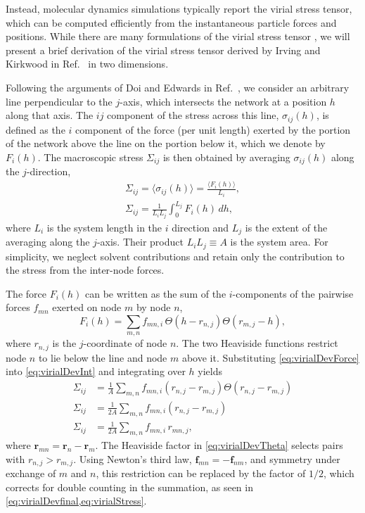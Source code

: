 \documentclass[asymmetricmargins]{library/duthesis}%
\begin{document}
Instead, molecular dynamics simulations typically report the virial stress tensor, which can be computed efficiently from the instantaneous particle forces and positions. While there are many formulations of the virial stress tensor \cite{walton_pressure_1983,erpenbeck_einstein-kubo-helfand_1995,tsai_virial_1979}, we will present a brief derivation of the virial stress tensor derived by Irving and Kirkwood in Ref.~\cite{irving_statistical_1950} in two dimensions.


Following the arguments of Doi and Edwards in Ref.~\cite{doi_theory_1988}, we consider an arbitrary line perpendicular to the $j$-axis, which intersects the network at a position $h$ along that axis. The $ij$ component of the stress across this line, $\sigma_{ij}(h)$, is defined as the $i$ component of the force (per unit length) exerted by the portion of the network above the line on the portion below it, which we denote by $F_i(h)$. The macroscopic stress $\Sigma_{ij}$ is then obtained by averaging $\sigma_{ij}(h)$ along the $j$-direction,
\begin{gather}
    \Sigma_{ij} = \langle \sigma_{ij}(h) \rangle = \frac{\langle F_i(h) \rangle}{L_i}, \\
    \Sigma_{ij} = \frac{1}{L_i L_j}\int_0^{L_j} F_i(h)\, dh,
    \label{eq:virialDevInt}
\end{gather}
where $L_i$ is the system length in the $i$ direction and $L_j$ is the extent of the averaging along the $j$-axis.  Their product $L_iL_j \equiv A$ is the system area. For simplicity, we neglect solvent contributions and retain only the contribution to the stress from the inter-node forces.

The force $F_i(h)$ can be written as the sum of the $i$-components of the pairwise forces $f_{mn}$ exerted on node $m$ by node $n$,
\begin{equation}
    F_i(h) = \sum_{m,n} f_{mn,i}\,
    \Theta(h-r_{n,j})\Theta(r_{m,j}-h),
    \label{eq:virialDevForce}
\end{equation}
where $r_{n,j}$ is the $j$-coordinate of node $n$. The two Heaviside functions restrict node $n$ to lie below the line and node $m$ above it. Substituting \cref{eq:virialDevForce} into \cref{eq:virialDevInt} and integrating over $h$ yields
\begin{subequations}
\begin{align}
    \Sigma_{ij}
    &= \frac{1}{A}\sum_{m,n}
    f_{mn,i}(r_{n,j}-r_{m,j})
    \Theta(r_{n,j}-r_{m,j})
    \label{eq:virialDevTheta} \\
    \Sigma_{ij} &= \frac{1}{2A}\sum_{m,n}
    f_{mn,i}(r_{n,j}-r_{m,j})
    \label{eq:virialDevfinal} \\
    \Sigma_{ij} &= \frac{1}{2A}\sum_{m,n}
    f_{mn,i}\, r_{mn,j},
    \label{eq:virialStress}
\end{align}
\end{subequations}
where $\bm{r}_{mn}=\bm{r}_n-\bm{r}_m$. The Heaviside factor in \cref{eq:virialDevTheta} selects pairs with $r_{n,j}>r_{m,j}$. Using Newton's third law, $\bm{f}_{mn}=-\bm{f}_{nm}$, and symmetry under exchange of $m$ and $n$, this restriction can be replaced by the factor of $1/2$, which corrects for double counting in the summation, as seen in \cref{eq:virialDevfinal,eq:virialStress}.
\end{document}

